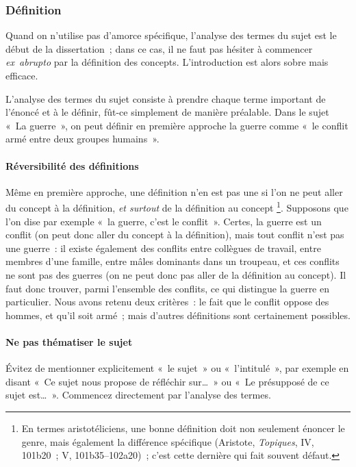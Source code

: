 \documentclass[a4paper,12pt]{article}
\begin{document}
\subsubsection{Définition}
\label{sec-2-2-1}

Quand on n'utilise pas d'amorce spécifique, l'analyse des termes du
sujet est le début de la dissertation ; dans ce cas, il ne faut pas
hésiter à commencer \emph{ex abrupto} par la définition des concepts.
L'introduction est alors sobre mais efficace.

L'analyse des termes du sujet consiste à prendre chaque terme important
de l'énoncé et à le définir, fût-ce simplement de manière préalable.
Dans le sujet « La guerre », on peut définir en première approche la
guerre comme « le conflit armé entre deux groupes humains ».

\paragraph{Réversibilité des définitions}
\label{sec-2-2-1-1}

Même en première approche, une définition n'en est pas une si l'on ne
peut aller du concept à la définition, \emph{et surtout} de la définition au
concept \footnote{En termes aristotéliciens, une bonne définition doit non seulement
énoncer le genre, mais également la différence spécifique (Aristote,
\emph{Topiques}, IV, 101b20 ; V, 101b35--102a20) ; c'est cette dernière
qui fait souvent défaut.}. Supposons que l'on dise par exemple « la guerre, c'est le
conflit ». Certes, la guerre est un conflit (on peut donc aller du
concept à la définition), mais tout conflit n'est pas une guerre : il
existe également des conflits entre collègues de travail, entre membres
d'une famille, entre mâles dominants dans un troupeau, et ces conflits
ne sont pas des guerres (on ne peut donc pas aller de la définition au
concept). Il faut donc trouver, parmi l'ensemble des conflits, ce qui
distingue la guerre en particulier. Nous avons retenu deux critères : le
fait que le conflit oppose des hommes, et qu'il soit armé ; mais
d'autres définitions sont certainement possibles.

\paragraph{Ne pas thématiser le sujet}
\label{sec-2-2-1-2}

Évitez de mentionner explicitement « le sujet » ou « l'intitulé », par
exemple en disant « Ce sujet nous propose de réfléchir sur\ldots{} » ou « Le
présupposé de ce sujet est\ldots{} ». Commencez directement par l'analyse des
termes.
\end{document}
